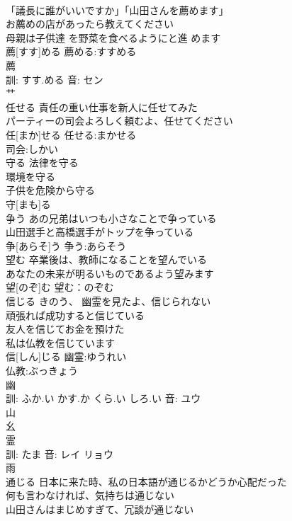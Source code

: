 \documentclass[8pt]{extreport}
\begin{document}
\begin{CJK}{UTF8}{min}
\\	「議長に誰がいいですか」「山田さんを薦めます」 
\\	お薦めの店があったら教えてください 
\\	母親は子供達 を野菜を食べるようにと進 めます 
\\	薦[すす]める			薦める:すすめる
\\	薦 
\\	訓: すす.める 音: セン 
\\	艹 
\\	任せる	責任の重い仕事を新人に任せてみた 
\\	パーティーの司会よろしく頼むよ、任せてください 
\\	任[まか]せる			任せる:まかせる
\\	司会:しかい
\\	守る	法律を守る 
\\	環境を守る 
\\	子供を危険から守る 
\\	守[まも]る						
\\	争う	あの兄弟はいつも小さなことで争っている 
\\	山田選手と高橋選手がトップを争っている 
\\	争[あらそ]う			争う:あらそう
\\	望む	卒業後は、教師になることを望んでいる 
\\	あなたの未来が明るいものであるよう望みます 
\\	望[のぞ]む			望む：のぞむ
\\	信じる	きのう、 幽霊を見たよ、信じられない 
\\	頑張れば成功すると信じている 
\\	友人を信じてお金を預けた 
\\	私は仏教を信じています 
\\	信[しん]じる			幽霊:ゆうれい
\\	仏教:ぶっきょう
\\	幽 
\\	訓: ふか.い かす.か くら.い しろ.い 音: ユウ 
\\	山 
\\	幺 
\\	霊 
\\	訓: たま 音: レイ リョウ 
\\	雨 
\\	通じる	日本に来た時、私の日本語が通じるかどうか心配だった 
\\	何も言わなければ、気持ちは通じない 
\\	山田さんはまじめすぎて、冗談が通じない 

\end{CJK}
\end{document}

